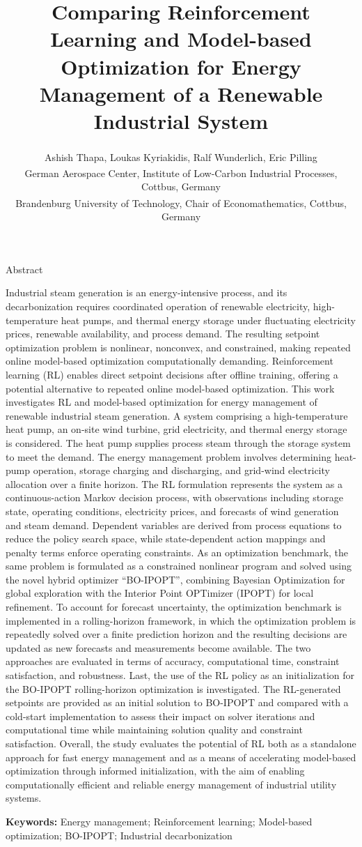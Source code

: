 \documentclass[11pt,a4paper]{article}
\title{\textbf{Comparing Reinforcement Learning and Model-based Optimization for Energy Management of a Renewable Industrial System}}
\author{Ashish Thapa\textsuperscript{\fontsize{7bp}{8bp}\selectfont 1}, Loukas Kyriakidis\textsuperscript{\fontsize{7bp}{8bp}\selectfont 1}, Ralf Wunderlich\textsuperscript{\fontsize{7bp}{8bp}\selectfont 2}, Eric Pilling\textsuperscript{\fontsize{7bp}{8bp}\selectfont 2}\\[0.3em]
\textsuperscript{\fontsize{7bp}{8bp}\selectfont 1}German Aerospace Center, Institute of Low-Carbon Industrial Processes, Cottbus, Germany\\[0.3em]
\textsuperscript{\fontsize{7bp}{8bp}\selectfont 2}Brandenburg University of Technology, Chair of Economathematics, Cottbus, Germany}
\date{}
\makeatletter
\renewcommand{\normalsize}{\fontsize{11bp}{14.5bp}\selectfont}
\renewcommand{\maketitle}{%
  \begin{center}
    {\timesfont\fontsize{16bp}{20bp}\selectfont\@title\par}
  \end{center}
  \vspace{12bp}
  {\timesfont\fontsize{11bp}{14bp}\selectfont\noindent\@author\par}
  \vspace{14bp}
}
\renewenvironment{abstract}{%
  \par{\abstractheadingfont\fontsize{14bp}{17bp}\selectfont Abstract\par}
  \vspace{2bp}\normalfont\normalsize
}{\par}
\makeatother
\begin{document}
\maketitle

\begin{abstract}
Industrial steam generation is an energy-intensive process, and its decarbonization requires coordinated operation of renewable electricity, high-temperature heat pumps, and thermal energy storage under fluctuating electricity prices, renewable availability, and process demand. The resulting setpoint optimization problem is nonlinear, nonconvex, and constrained, making repeated online model-based optimization computationally demanding. Reinforcement learning (RL) enables direct setpoint decisions after offline training, offering a potential alternative to repeated online model-based optimization. This work investigates RL and model-based optimization for energy management of renewable industrial steam generation. A system comprising a high-temperature heat pump, an on-site wind turbine, grid electricity, and thermal energy storage is considered. The heat pump supplies process steam through the storage system to meet the demand. The energy management problem involves determining heat-pump operation, storage charging and discharging, and grid-wind electricity allocation over a finite horizon. The RL formulation represents the system as a continuous-action Markov decision process, with observations including storage state, operating conditions, electricity prices, and forecasts of wind generation and steam demand. Dependent variables are derived from process equations to reduce the policy search space, while state-dependent action mappings and penalty terms enforce operating constraints. As an optimization benchmark, the same problem is formulated as a constrained nonlinear program and solved using the novel hybrid optimizer “BO-IPOPT”, combining Bayesian Optimization for global exploration with the Interior Point OPTimizer (IPOPT) for local refinement. To account for forecast uncertainty, the optimization benchmark is implemented in a rolling-horizon framework, in which the optimization problem is repeatedly solved over a finite prediction horizon and the resulting decisions are updated as new forecasts and measurements become available. The two approaches are evaluated in terms of accuracy, computational time, constraint satisfaction, and robustness. Last, the use of the RL policy as an initialization for the BO-IPOPT rolling-horizon optimization is investigated. The RL-generated setpoints are provided as an initial solution to BO-IPOPT and compared with a cold-start implementation to assess their impact on solver iterations and computational time while maintaining solution quality and constraint satisfaction. Overall, the study evaluates the potential of RL both as a standalone approach for fast energy management and as a means of accelerating model-based optimization through informed initialization, with the aim of enabling computationally efficient and reliable energy management of industrial utility systems.
\end{abstract}

\begingroup\timesfont\fontsize{11bp}{14bp}\selectfont
\noindent\textbf{Keywords:} Energy management; Reinforcement learning; Model-based optimization; BO-IPOPT; Industrial decarbonization

\par\endgroup
\end{document}
